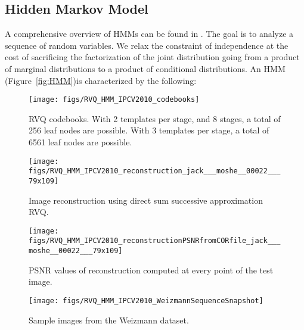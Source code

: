 \documentclass{article}
\begin{document}
\subsection{Hidden Markov Model}
A comprehensive overview of HMMs can be found in \cite{1989_JNL_TutorialHMM_Rabiner}.  The goal is to analyze a sequence of random variables.  We relax the constraint of independence at the cost of sacrificing the factorization of the joint distribution going from a product of marginal distributions to a product of conditional distributions.  An HMM (Figure~\ref{fig:HMM})is characterized by the following:  

					\begin{figure}				
					\texttt{[image: figs/RVQ\_HMM\_IPCV2010\_codebooks]}
					\centering
					\caption{RVQ codebooks.  With 2 templates per stage, and 8 stages, a total of 256 leaf nodes are possible.  With 3 templates per stage, a total of 6561 leaf nodes are possible.}
					\label{fig:codebooks}
			\end{figure}	


					\begin{figure}	
					\centering			
					\texttt{[image: figs/RVQ\_HMM\_IPCV2010\_reconstruction\_jack\_\_\_moshe\_\_00022\_\_\_79x109]}
					\caption{Image reconstruction using direct sum successive approximation RVQ.}
					\label{fig:reconstruction}
			\end{figure}	
			
								\begin{figure}				
					\texttt{[image: figs/RVQ\_HMM\_IPCV2010\_reconstructionPSNRfromCORfile\_jack\_\_\_moshe\_\_00022\_\_\_79x109]}
					\centering
					\caption{PSNR values of reconstruction computed at every point of the test image.}
					\label{fig:corFile}
			\end{figure}
			
								\begin{figure*}		
								\centering		
					\texttt{[image: figs/RVQ\_HMM\_IPCV2010\_WeizmannSequenceSnapshot]}
					\centering
					\caption{Sample images from the Weizmann dataset.}
					\label{fig:sequence}
			\end{figure*}
			
\end{document}
